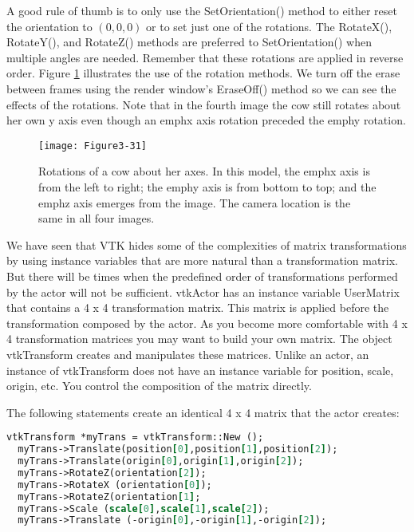 A good rule of thumb is to only use the SetOrientation() method to either reset the orientation to $(0,0,0)$ or to set just one of the rotations. The RotateX(), RotateY(), and RotateZ() methods are preferred to SetOrientation() when multiple angles are needed. Remember that these rotations are applied in reverse order. Figure \ref{fig:Figure3-31} illustrates the use of the rotation methods. We turn off the erase between frames using the render window's EraseOff() method so we can see the effects of the rotations. Note that in the fourth image the cow still rotates about her own y axis even though an emph{x} axis rotation preceded the emph{y} rotation.

\begin{figure}[!htb]
  \centering
  \texttt{[image: Figure3-31]}\\
  \caption{Rotations of a cow about her axes. In this model, the emph{x} axis is from the left to right; the emph{y} axis is from bottom to top; and the emph{z} axis emerges from the image. The camera location is the same in all four images.}\label{fig:Figure3-31}
\end{figure}


We have seen that VTK hides some of the complexities of matrix transformations by using instance variables that are more natural than a transformation matrix. But there will be times when the predefined order of transformations performed by the actor will not be sufficient. vtkActor has an instance variable UserMatrix that contains a 4 x 4 transformation matrix. This matrix is applied before the transformation composed by the actor. As you become more comfortable with 4 x 4 transformation matrices you may want to build your own matrix. The object vtkTransform creates and manipulates these matrices. Unlike an actor, an instance of vtkTransform does not have an instance variable for position, scale, origin, etc. You control the composition of the matrix directly.

The following statements create an identical 4 x 4 matrix that the actor creates:

\begin{lstlisting}[language=TCL, caption={}]
vtkTransform *myTrans = vtkTransform::New ();
  myTrans->Translate(position[0],position[1],position[2]);
  myTrans->Translate(origin[0],origin[1],origin[2]);
  myTrans->RotateZ(orientation[2]);
  myTrans->RotateX (orientation[0]);
  myTrans->RotateZ(orientation[1];
  myTrans->Scale (scale[0],scale[1],scale[2]);
  myTrans->Translate (-origin[0],-origin[1],-origin[2]);
\end{lstlisting}

